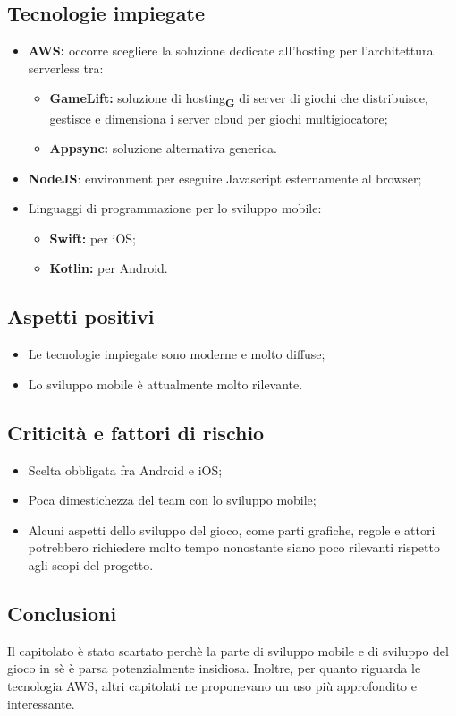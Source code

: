 \subsection{Tecnologie impiegate}
\begin{itemize}
    \item \textbf{AWS:} occorre scegliere la soluzione dedicate all'hosting per l'architettura serverless tra:
          \begin{itemize}
              \item \textbf{GameLift:} soluzione di hosting\textsubscript{\textbf{G}} di server di giochi che distribuisce, gestisce e dimensiona i server cloud per giochi multigiocatore;
              \item \textbf{Appsync:} soluzione alternativa generica.
          \end{itemize}
    \item \textbf{NodeJS}: environment per eseguire Javascript esternamente al browser;
    \item Linguaggi di programmazione per lo sviluppo mobile:
          \begin{itemize}
              \item \textbf{Swift:} per iOS;
              \item \textbf{Kotlin:} per Android.
          \end{itemize}
\end{itemize}
\subsection{Aspetti positivi}
\begin{itemize}
    \item Le tecnologie impiegate sono moderne e molto diffuse;
    \item Lo sviluppo mobile è attualmente molto rilevante.
\end{itemize}
\subsection{Criticità e fattori di rischio}
\begin{itemize}
    \item Scelta obbligata fra Android e iOS;
    \item Poca dimestichezza del team con lo sviluppo mobile;
    \item Alcuni aspetti dello sviluppo del gioco, come parti grafiche, regole e attori potrebbero richiedere molto tempo nonostante siano poco rilevanti rispetto agli scopi del progetto.
\end{itemize}
\subsection{Conclusioni}
Il capitolato è stato scartato perchè la parte di sviluppo mobile e di sviluppo del gioco in sè è parsa potenzialmente insidiosa. Inoltre, per quanto riguarda le tecnologia AWS, altri capitolati ne proponevano un uso più approfondito e interessante.